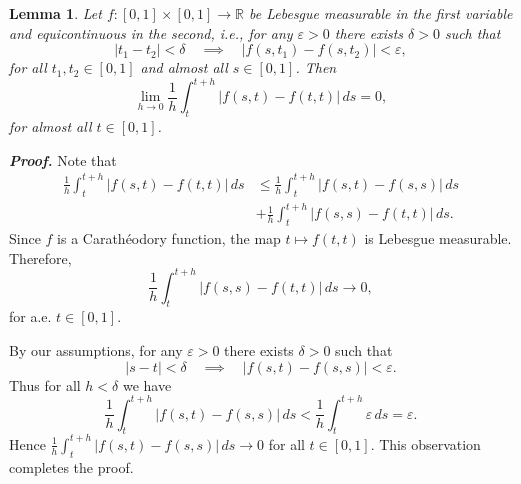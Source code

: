 \documentclass[sn-mathphys-num]{sn-jnl}
\numberwithin{equation}{section}
\theoremstyle{mythm}
\newtheorem{lemma}[proposition]{Lemma}
\theoremstyle{mydef}
\renewenvironment{proof}{\smallskip\noindent\emph{\textbf{Proof.}}%
  \hspace{1pt}}{\hspace{-5pt}{\nobreak\quad\nobreak\hfill\nobreak%
    $\square$\vspace{2pt}\par}\smallskip\goodbreak}
\renewcommand{\d}{\,d}
\begin{document}
\begin{lemma}
  \label{lem:carat}
  Let \( f \colon [0,1] \times [0,1] \to \mathbb{R} \) be Lebesgue measurable in the first variable and equicontinuous in the second, i.e., for any \( \varepsilon>0 \) there exists \( \delta>0 \) such that
\[
|t_1-t_2|<\delta \quad \implies \quad  |f(s,t_{1}) - f(s,t_2)|< \varepsilon,
\]
for all \( t_{1},t_2\in [0,1] \) and almost all \( s\in [0,1] \).
Then
\[
\lim_{h\to 0}\frac{1}{h}\int_t^{t+h}\left|f(s,t)-f(t,t)\right|\d s=0,
\]
for almost all \( t\in [0,1] \).
\end{lemma}
\begin{proof}
  Note that
  \begin{align*}
\frac{1}{h}\int_t^{t+h}\left|f(s,t)-f(t,t)\right|\d s & \le
\frac{1}{h}\int_t^{t+h}\left|f(s,t)-f(s,s)\right|\d s\\
& +
\frac{1}{h}\int_t^{t+h}\left|f(s,s)-f(t,t)\right|\d s.      
  \end{align*}
  Since \( f \) is a Carath\'eodory function, the map \( t \mapsto f(t,t) \) is Lebesgue measurable.
  Therefore,
\[
\frac{1}{h}\int_t^{t+h}\left|f(s,s)-f(t,t)\right|\d s \to 0,
\]
for a.e. \( t\in [0,1] \).

By our assumptions, for any \( \varepsilon>0 \) there exists \( \delta>0 \) such that
\[
|s-t|<\delta \quad \implies \quad |f(s,t)-f(s,s)|<\varepsilon.
\]
Thus for all \( h<\delta \) we have
\[
  \frac{1}{h}\int_t^{t+h}\left|f(s,t)-f(s,s)\right|\d s<
  \frac{1}{h}\int_t^{t+h}\varepsilon\d s = \varepsilon.
\]
Hence \( \frac{1}{h}\int_t^{t+h}\left|f(s,t)-f(s,s)\right|\d s \to 0\) for all \( t\in [0,1] \).
This observation completes the proof.
\end{proof}
\end{document}
